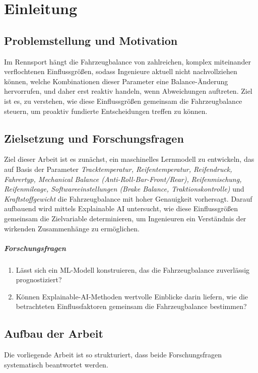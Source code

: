 \chapter{Einleitung}
\section{Problemstellung und Motivation}
Im Rennsport hängt die Fahrzeugbalance von zahlreichen, komplex miteinander verflochtenen Einflussgrößen, sodass Ingenieure aktuell nicht nachvollziehen können, welche Kombinationen dieser Parameter eine Balance-Änderung hervorrufen, und daher erst reaktiv handeln, wenn Abweichungen auftreten. Ziel ist es, zu verstehen, wie diese Einflussgrößen gemeinsam die Fahrzeugbalance steuern, um proaktiv fundierte Entscheidungen treffen zu können.

\section{Zielsetzung und Forschungsfragen}

Ziel dieser Arbeit ist es zunächst, ein maschinelles Lernmodell zu entwickeln, das auf Basis der Parameter  
\textit{Tracktemperatur, Reifentemperatur, Reifendruck, Fahrertyp, Mechanical Balance (Anti-Roll-Bar-Front/Rear),}  
\textit{Reifenmischung, Reifenmileage, Softwareeinstellungen (Brake Balance, Traktionskontrolle)} und  
\textit{Kraftstoffgewicht} die Fahrzeugbalance mit hoher Genauigkeit vorhersagt. Darauf aufbauend wird  
mittels Explainable AI untersucht, wie diese Einflussgrößen gemeinsam die Zielvariable determinieren,  
um Ingenieuren ein Verständnis der wirkenden Zusammenhänge zu ermöglichen.

\paragraph{Forschungsfragen}
\begin{enumerate}
  \item Lässt sich ein ML-Modell konstruieren, das die Fahrzeugbalance zuverlässig prognostiziert?
  \item Können Explainable-AI-Methoden wertvolle Einblicke darin liefern, wie die betrachteten Einflussfaktoren gemeinsam die Fahrzeugbalance bestimmen?
\end{enumerate}


\section{Aufbau der Arbeit}
Die vorliegende Arbeit ist so strukturiert, dass beide Forschungsfragen systematisch beantwortet werden. 

